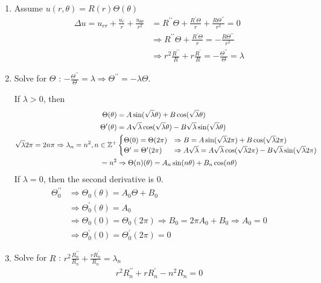 \documentclass{article}
\begin{document}
\begin{enumerate}
  \item Assume $u(r, \theta) = R(r) \Theta(\theta)$
  \begin{align}
    \Delta u = u_{rr} + \frac{u_r}{r} + \frac{u_{\theta\theta}}{r^2} & = R^{\prime\prime} \Theta + \frac{R^\prime \Theta}{r} + \frac{R \Theta^{\prime\prime}}{r^2} = 0\\
    & \Rightarrow R^{\prime\prime} \Theta + \frac{R^\prime \Theta}{r} = - \frac{R\Theta^{\prime\prime}}{r^2}\\
    & \Rightarrow r^2 \frac{R^{\prime\prime}}{R} + r \frac{R^\prime}{R} = - \frac{\Theta^{\prime\prime}}{\Theta} = \lambda
  \end{align}
  \item Solve for $\Theta$ : $- \frac{\Theta^{\prime\prime}}{\Theta} = \lambda \Rightarrow \Theta^{\prime\prime} = -\lambda \Theta$.

  If $\lambda > 0$, then
  \begin{align}
    \Theta(\theta) & =
    A \sin(\sqrt \lambda \theta) + B \cos(\sqrt \lambda \theta)\\
    \Theta^\prime(\theta) & =
    A \sqrt \lambda \cos ( \sqrt \lambda \theta) - B \sqrt \lambda \sin (\sqrt \lambda \theta)\\
    \sqrt \lambda 2 \pi = 2 n \pi \Rightarrow \lambda_n = n^2, n \in \mathbb Z^+ &
    \begin{cases}
      \Theta(0) = \Theta(2\pi) & \Rightarrow
      B = A \sin(\sqrt \lambda 2 \pi) + B \cos(\sqrt \lambda 2 \pi)\\
      \Theta^\prime = \Theta^\prime(2 \pi) & \Rightarrow
      A \sqrt \lambda = A \sqrt \lambda \cos (\sqrt \lambda 2 \pi) - B \sqrt \lambda \sin (\sqrt \lambda 2 \pi)
    \end{cases}\\
    = n^2 & \Rightarrow
    \Theta(n)(\theta) = A_n \sin(n \theta) + B_n \cos(n \theta)
  \end{align}
  If $\lambda = 0$, then the second derivative is $0$.
  \begin{align}
    \Theta^{\prime\prime}_0 & \Rightarrow
    \Theta_0(\theta) = A_0\Theta + B_0\\
    & \Rightarrow \Theta^\prime_0 (\theta) = A_0\\
    & \Rightarrow \Theta_0(0) = \Theta_0(2 \pi) \Rightarrow B_0 = 2 \pi A_0 + B_0 \Rightarrow A_0 = 0\\
    & \Rightarrow \Theta^\prime_0(0) = \Theta^\prime_0 (2 \pi) = 0
  \end{align}
  \item Solve for $R$ : $r^2 \frac{R^{\prime\prime}_n}{R_n} + \frac{rR^\prime_n}{R_n} = \lambda_n$
  \begin{align}
    r^2 R^{\prime\prime}_n + rR^\prime_n - n^2 R_n = 0\\
  \end{align}


\end{enumerate}
\end{document}
